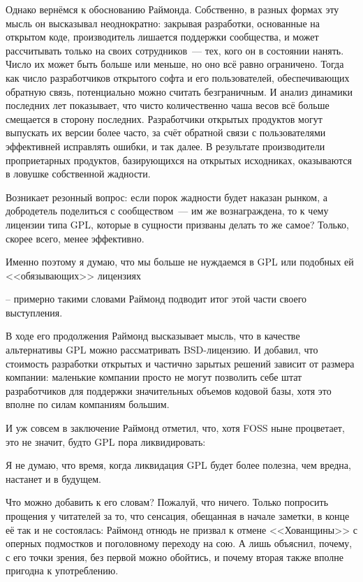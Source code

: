Однако вернёмся к обоснованию Раймонда. Собственно, в разных формах эту мысль он высказывал неоднократно: закрывая разработки, основанные на открытом коде, производитель лишается поддержки сообщества, и может рассчитывать только на своих сотрудников~--- тех, кого он в состоянии нанять. Число их может быть больше или меньше, но оно всё равно ограничено. Тогда как число разработчиков открытого софта и его пользователей, обеспечивающих обратную связь, потенциально можно считать безграничным. И анализ динамики последних лет показывает, что чисто количественно чаша весов всё больше смещается в сторону последних. Разработчики открытых продуктов могут выпускать их версии более часто, за счёт обратной связи с пользователями эффективней исправлять ошибки, и так далее. В результате производители проприетарных продуктов, базирующихся на открытых исходниках, оказываются в ловушке собственной жадности.

Возникает резонный вопрос: если порок жадности будет наказан рынком, а добродетель поделиться с сообществом~--- им же вознаграждена, то к чему лицензии типа GPL, которые в сущности призваны делать то же самое? Только, скорее всего, менее эффективно.


\begin{shadequote}{}Именно поэтому я думаю, что мы больше не нуждаемся в GPL или подобных ей <<обязывающих>> лицензиях\end{shadequote}

-- примерно такими словами Раймонд подводит итог этой части своего выступления.

В ходе его продолжения Раймонд высказывает мысль, что в качестве альтернативы GPL можно рассматривать BSD-лицензию. И добавил, что стоимость разработки открытых и частично зарытых решений зависит от размера компании: маленькие компании просто не могут позволить себе штат разработчиков для поддержки значительных объемов кодовой базы, хотя это вполне по силам компаниям большим.

И уж совсем в заключение Раймонд отметил, что, хотя FOSS ныне процветает, это не значит, будто GPL пора ликвидировать:


\begin{shadequote}{}Я не думаю, что время, когда ликвидация GPL будет более полезна, чем вредна, настанет и в будущем.\end{shadequote}

Что можно добавить к его словам? Пожалуй, что ничего. Только попросить прощения у читателей за то, что сенсация, обещанная в начале заметки, в конце её так и не состоялась: Раймонд отнюдь не призвал к отмене <<Хованщины>> с оперных подмостков и поголовному переходу на сою. А лишь объяснил, почему, с его точки зрения, без первой можно обойтись, и почему вторая также вполне пригодна к употреблению.

